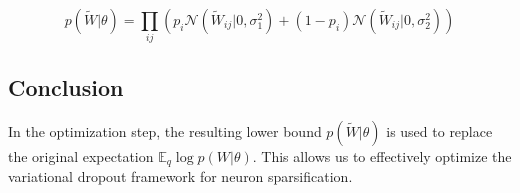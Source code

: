 \documentclass{article}
\newcommand{\N}{\mathcal{N}}
\newcommand{\E}{\mathbb{E}}
\begin{document}
\begin{equation}
    p(\tilde{W}|\theta) = \prod_{ij} \left( p_i \N(\tilde{W}_{ij}|0, \sigma_1^2) + (1 - p_i)\N(\tilde{W}_{ij}|0, \sigma_2^2)\right)
\end{equation}

\subsection{Conclusion}

In the optimization step, the resulting lower bound $p(\tilde{W}|\theta)$ is used to replace the original expectation $\E_q \log p(W|\theta)$. This allows us to effectively optimize the variational dropout framework for neuron sparsification.
\end{document}
